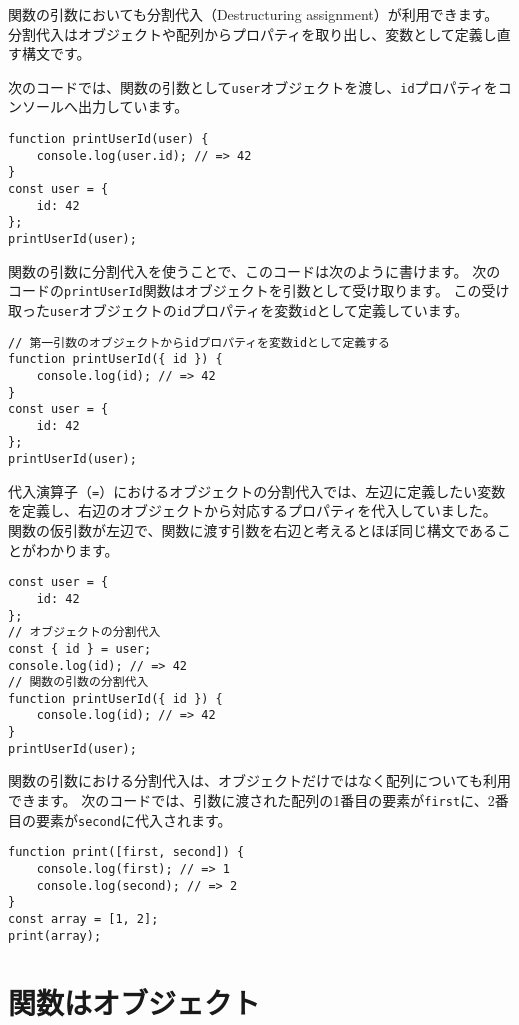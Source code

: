 関数の引数においても分割代入（Destructuring assignment）が利用できます。
分割代入はオブジェクトや配列からプロパティを取り出し、変数として定義し直す構文です。

次のコードでは、関数の引数として\texttt{user}オブジェクトを渡し、\texttt{id}プロパティをコンソールへ出力しています。

\begin{lstlisting}
function printUserId(user) {
    console.log(user.id); // => 42
}
const user = {
    id: 42
};
printUserId(user);
\end{lstlisting}

関数の引数に分割代入を使うことで、このコードは次のように書けます。
次のコードの\texttt{printUserId}関数はオブジェクトを引数として受け取ります。
この受け取った\texttt{user}オブジェクトの\texttt{id}プロパティを変数\texttt{id}として定義しています。

\begin{lstlisting}
// 第一引数のオブジェクトからidプロパティを変数idとして定義する
function printUserId({ id }) {
    console.log(id); // => 42
}
const user = {
    id: 42
};
printUserId(user);
\end{lstlisting}

代入演算子（\texttt{=}）におけるオブジェクトの分割代入では、左辺に定義したい変数を定義し、右辺のオブジェクトから対応するプロパティを代入していました。
関数の仮引数が左辺で、関数に渡す引数を右辺と考えるとほぼ同じ構文であることがわかります。

\begin{lstlisting}
const user = {
    id: 42
};
// オブジェクトの分割代入
const { id } = user;
console.log(id); // => 42
// 関数の引数の分割代入
function printUserId({ id }) {
    console.log(id); // => 42
}
printUserId(user);
\end{lstlisting}

関数の引数における分割代入は、オブジェクトだけではなく配列についても利用できます。
次のコードでは、引数に渡された配列の1番目の要素が\texttt{first}に、2番目の要素が\texttt{second}に代入されます。

\begin{lstlisting}
function print([first, second]) {
    console.log(first); // => 1
    console.log(second); // => 2
}
const array = [1, 2];
print(array);
\end{lstlisting}

\hypertarget{first-class-function}{%
\section{関数はオブジェクト}\label{first-class-function}}

